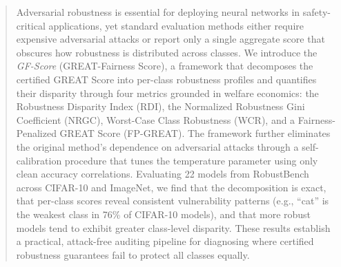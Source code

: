 \begin{abstract}
Adversarial robustness is essential for deploying neural networks in safety-critical applications, yet standard evaluation methods either require expensive adversarial attacks or report only a single aggregate score that obscures how robustness is distributed across classes. We introduce the \emph{GF-Score} (GREAT-Fairness Score), a framework that decomposes the certified GREAT Score into per-class robustness profiles and quantifies their disparity through four metrics grounded in welfare economics: the Robustness Disparity Index (RDI), the Normalized Robustness Gini Coefficient (NRGC), Worst-Case Class Robustness (WCR), and a Fairness-Penalized GREAT Score (FP-GREAT). The framework further eliminates the original method's dependence on adversarial attacks through a self-calibration procedure that tunes the temperature parameter using only clean accuracy correlations. Evaluating 22 models from RobustBench across CIFAR-10 and ImageNet, we find that the decomposition is exact, that per-class scores reveal consistent vulnerability patterns (e.g., ``cat'' is the weakest class in 76\% of CIFAR-10 models), and that more robust models tend to exhibit greater class-level disparity. These results establish a practical, attack-free auditing pipeline for diagnosing where certified robustness guarantees fail to protect all classes equally.
\end{abstract}
